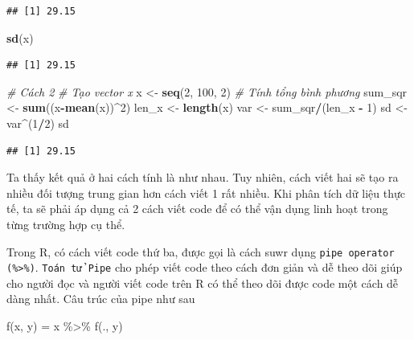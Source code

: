 \documentclass[]{krantz}
\makeatletter
\newenvironment{Shaded}{\begin{snugshade}}{\end{snugshade}}
\newcommand{\CommentTok}[1]{\textcolor[rgb]{0.37,0.37,0.37}{\textit{#1}}}
\newcommand{\DecValTok}[1]{\textcolor[rgb]{0.06,0.06,0.06}{#1}}
\newcommand{\KeywordTok}[1]{\textcolor[rgb]{0.27,0.27,0.27}{\textbf{#1}}}
\newcommand{\NormalTok}[1]{#1}
\newcommand{\OperatorTok}[1]{\textcolor[rgb]{0.43,0.43,0.43}{\textbf{#1}}}
\newcommand{\StringTok}[1]{\textcolor[rgb]{0.5,0.5,0.5}{#1}}
\renewenvironment{quote}{\begin{VF}}{\end{VF}}
\newenvironment{kframe}{%
\medskip{}
\setlength{\fboxsep}{.8em}
 \def\at@end@of@kframe{}%
 \ifinner\ifhmode%
  \def\at@end@of@kframe{\end{minipage}}%
  \begin{minipage}{\columnwidth}%
 \fi\fi%
 \def\FrameCommand##1{\hskip\@totalleftmargin \hskip-\fboxsep
 \colorbox{shadecolor}{##1}\hskip-\fboxsep
     \hskip-\linewidth \hskip-\@totalleftmargin \hskip\columnwidth}%
 \MakeFramed {\advance\hsize-\width
   \@totalleftmargin\z@ \linewidth\hsize
   \@setminipage}}%
 {\par\unskip\endMakeFramed%
 \at@end@of@kframe}
\renewenvironment{Shaded}{\begin{kframe}}{\end{kframe}}
\renewenvironment{Shaded}{\begin{snugshade}}{\end{snugshade}}
\renewcommand{\CommentTok}[1]{\textcolor[rgb]{0.56,0.35,0.01}{\textit{#1}}}
\renewcommand{\DecValTok}[1]{\textcolor[rgb]{0.00,0.00,0.81}{#1}}
\renewcommand{\KeywordTok}[1]{\textcolor[rgb]{0.13,0.29,0.53}{\textbf{#1}}}
\renewcommand{\NormalTok}[1]{#1}
\renewcommand{\OperatorTok}[1]{\textcolor[rgb]{0.81,0.36,0.00}{\textbf{#1}}}
\renewcommand{\StringTok}[1]{\textcolor[rgb]{0.31,0.60,0.02}{#1}}
\theoremstyle{definition}
\theoremstyle{definition}
\theoremstyle{definition}
\theoremstyle{remark}
\makeatother
\begin{document}
\begin{verbatim}
## [1] 29.15
\end{verbatim}

\begin{Shaded}
\begin{Highlighting}[]
\KeywordTok{sd}\NormalTok{(x)}
\end{Highlighting}
\end{Shaded}

\begin{verbatim}
## [1] 29.15
\end{verbatim}

\begin{Shaded}
\begin{Highlighting}[]
\CommentTok{# Cách 2}
\CommentTok{# Tạo vector x}
\NormalTok{x <-}\StringTok{ }\KeywordTok{seq}\NormalTok{(}\DecValTok{2}\NormalTok{, }\DecValTok{100}\NormalTok{, }\DecValTok{2}\NormalTok{)}
\CommentTok{# Tính tổng bình phương }
\NormalTok{sum_sqr <-}\StringTok{ }\KeywordTok{sum}\NormalTok{((x}\OperatorTok{-}\KeywordTok{mean}\NormalTok{(x))}\OperatorTok{^}\DecValTok{2}\NormalTok{)}
\NormalTok{len_x <-}\StringTok{ }\KeywordTok{length}\NormalTok{(x)}
\NormalTok{var <-}\StringTok{ }\NormalTok{sum_sqr}\OperatorTok{/}\NormalTok{(len_x }\OperatorTok{-}\StringTok{ }\DecValTok{1}\NormalTok{)}
\NormalTok{sd <-}\StringTok{ }\NormalTok{var}\OperatorTok{^}\NormalTok{(}\DecValTok{1}\OperatorTok{/}\DecValTok{2}\NormalTok{)}
\NormalTok{sd}
\end{Highlighting}
\end{Shaded}

\begin{verbatim}
## [1] 29.15
\end{verbatim}

Ta thấy kết quả ở hai cách tính là như nhau. Tuy nhiên, cách viết hai sẽ
tạo ra nhiều đối tượng trung gian hơn cách viết 1 rất nhiều. Khi phân
tích dữ liệu thực tế, ta sẽ phải áp dụng cả 2 cách viết code để có thể
vận dụng linh hoạt trong từng trường hợp cụ thể.

Trong R, có cách viết code thứ ba, được gọi là cách suwr dụng
\texttt{pipe\ operator} \texttt{(\%\textgreater{}\%)}.
\texttt{Toán\ tử\ Pipe} cho phép viết code theo cách đơn giản và dễ theo
dõi giúp cho người đọc và người viết code trên R có thể theo dõi được
code một cách dễ dàng nhất. Câu trúc của pipe như sau

\begin{quote}
f(x, y) = x \%\textgreater{}\% f(., y)
\end{quote}
\end{document}
